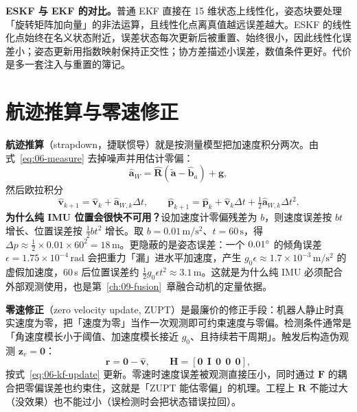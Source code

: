 \textbf{ESKF 与 EKF 的对比。}普通 EKF 直接在 15 维状态上线性化，姿态块要处理「旋转矩阵加向量」的非法运算，且线性化点离真值越远误差越大。ESKF 的线性化点始终在名义状态附近，误差状态每次更新后被重置、始终很小，因此线性化误差小；姿态更新用指数映射保持正交性；协方差描述小误差，数值条件更好。代价是多一套注入与重置的簿记。

\section{航迹推算与零速修正}\label{sec:06-strapdown}

\textbf{航迹推算}（strapdown，捷联惯导）就是按测量模型把加速度积分两次。由式~\eqref{eq:06-measure} 去掉噪声并用估计零偏：
\begin{equation}
  \hat{\bm{a}}_W = \hat{\bm{R}}\left(\tilde{\bm{a}}-\hat{\bm{b}}_a\right)+\bm{g},
  \label{eq:06-acc-world}
\end{equation}
然后欧拉积分
\begin{equation}
  \hat{\bm{v}}_{k+1}=\hat{\bm{v}}_k+\hat{\bm{a}}_{W,k}\Delta t,
  \qquad
  \hat{\bm{p}}_{k+1}=\hat{\bm{p}}_k+\hat{\bm{v}}_k\Delta t+\tfrac{1}{2}\hat{\bm{a}}_{W,k}\Delta t^{2}.
  \label{eq:06-integration}
\end{equation}
\textbf{为什么纯 IMU 位置会很快不可用？}设加速度计零偏残差为 $b$，则速度误差按 $bt$ 增长、位置误差按 $\tfrac{1}{2}bt^{2}$ 增长。取 $b=0.01\,\mathrm{m/s^2}$、$t=60\,\mathrm{s}$，得 $\Delta p\approx\tfrac{1}{2}\times0.01\times60^{2}=18\,\mathrm{m}$。更隐蔽的是姿态误差：一个 $0.01^\circ$ 的倾角误差 $\epsilon=1.75\times10^{-4}\,\mathrm{rad}$ 会把重力「漏」进水平加速度，产生 $g_0\epsilon\approx1.7\times10^{-3}\,\mathrm{m/s^{2}}$ 的虚假加速度，60\,s 后位置误差约 $\tfrac{1}{2}g_0\epsilon t^{2}\approx3.1\,\mathrm{m}$。这就是为什么纯 IMU 必须配合外部观测使用，也是第~\ref{ch:09-fusion}~章融合动机的定量依据。

\textbf{零速修正}（zero velocity update, ZUPT）是最廉价的修正手段：机器人静止时真实速度为零，把「速度为零」当作一次观测即可约束速度与零偏。检测条件通常是「角速度模长小于阈值、加速度模长接近 $g_0$、且持续若干周期」。触发后构造伪观测 $\bm{z}_v=\bm{0}$：
\begin{equation}
  \bm{r} = \bm{0}-\hat{\bm{v}},\qquad
  \bm{H}=\left[\bm{0}\ \ \bm{I}\ \ \bm{0}\ \ \bm{0}\ \ \bm{0}\right],
\end{equation}
按式~\eqref{eq:06-kf-update} 更新。零速时速度误差被观测直接压小，同时通过 $\bm{F}$ 的耦合把零偏误差也约束住，这就是「ZUPT 能估零偏」的机理。工程上 $\bm{R}$ 不能过大（没效果）也不能过小（误检测时会把状态错误拉回）。

